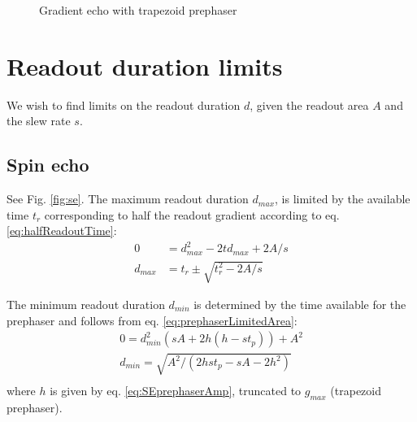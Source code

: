 \documentclass{article}
\begin{document}
\begin{figure}
    \centering
    \caption{Gradient echo with trapezoid prephaser}
    \label{fig:gre}
\end{figure}

\newpage
\section{Readout duration limits}
We wish to find limits on the readout duration $d$, given the readout area $A$ and the slew rate $s$.

\subsection{Spin echo}
See Fig. \ref{fig:se}. 
The maximum readout duration $d_{max}$, is limited by the available time $t_r$ corresponding to half the readout gradient according to eq. \ref{eq:halfReadoutTime}:
\begin{equation}
    \begin{split}
        0 & = d_{max}^2-2td_{max}+2A/s \\
        d_{max} & = t_r \pm \sqrt{t_r^2-2A/s}
    \end{split}
\end{equation}

The minimum readout duration $d_{min}$ is determined by the time available for the prephaser and follows from eq. \ref{eq:prephaserLimitedArea}:
\begin{equation}
    \begin{split}
        0 = d_{min}^2(sA+2h(h-st_p)) + A^2 \\
        d_{min} = \sqrt{A^2/(2hst_p - sA - 2h^2)} \\
    \end{split}
\end{equation}
where $h$ is given by eq. \ref{eq:SEprephaserAmp}, truncated to $g_{max}$ (trapezoid prephaser). 
\end{document}
